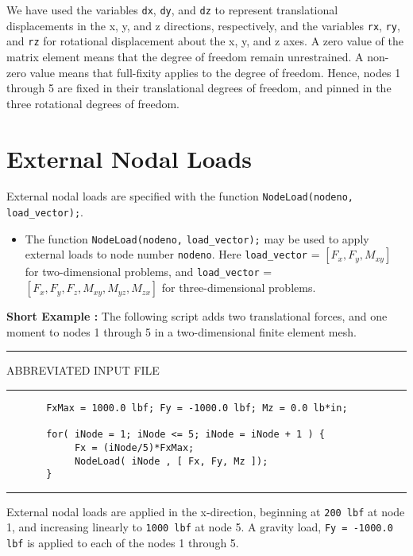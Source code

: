 \vspace{0.15 in}\noindent
We have used the variables
{\tt dx}, {\tt dy}, and {\tt dz} to represent translational displacements
in the x, y, and z directions, respectively, and the variables
{\tt rx}, {\tt ry}, and {\tt rz} for rotational displacement about
the x, y, and z axes. A zero value of the matrix element means that the
degree of freedom remain unrestrained. A non-zero value means that full-fixity
applies to the degree of freedom. Hence, nodes 1 through 5 are fixed in
their translational degrees of freedom, and pinned in the three
rotational degrees of freedom.

\section{External Nodal Loads}

\vspace{0.15 in}\noindent
External nodal loads are specified with the function {\tt NodeLoad(nodeno,} {\tt load\_vector);}.

\begin{itemize}
\item{}
The function {\tt NodeLoad(nodeno,} {\tt load\_vector);} may be used
to apply external loads to node number {\tt nodeno}.
Here {\tt load\_vector} = $ [F_x, F_y, M_{xy}]$ for two-dimensional problems,
and {\tt load\_vector} = $ [F_x, F_y, F_z, M_{xy}, M_{yz}, M_{zx} ]$
for three-dimensional problems.
\end{itemize}

\vspace{0.15 in}\noindent
{\bf Short Example :} The following script adds two translational forces,
and one moment to nodes 1 through 5 in a two-dimensional finite element mesh.

\vspace{0.15 in}
\begin{footnotesize}
\noindent
{\rule{2.1 in}{0.035 in} ABBREVIATED INPUT FILE \rule{2.1 in}{0.035 in} }
\begin{verbatim}
       FxMax = 1000.0 lbf; Fy = -1000.0 lbf; Mz = 0.0 lb*in;

       for( iNode = 1; iNode <= 5; iNode = iNode + 1 ) {
            Fx = (iNode/5)*FxMax;
            NodeLoad( iNode , [ Fx, Fy, Mz ]); 
       }
\end{verbatim}
\rule{6.25 in}{0.035 in}
\end{footnotesize}

\vspace{0.15 in}\noindent
External nodal loads are applied in the x-direction,
beginning at {\tt 200 lbf} at node 1, and increasing
linearly to {\tt 1000 lbf} at node 5. A gravity load,
{\tt Fy = -1000.0 lbf} is applied to each of the nodes 1 through 5.


